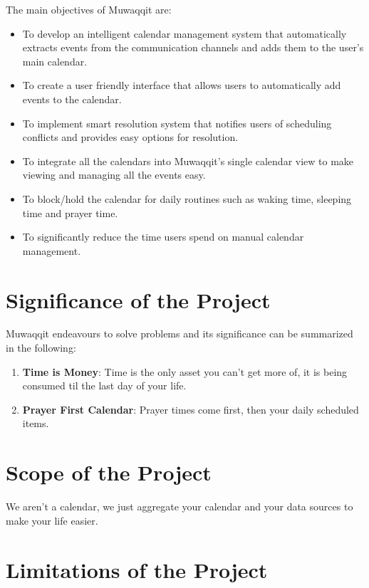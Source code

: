 \documentclass[12pt,a4paper]{article}
\begin{document}
The main objectives of Muwaqqit are:

\begin{itemize}
    \item To develop an intelligent calendar management system that automatically extracts events from the communication channels and adds them to the user's main calendar.
    \item To create a user friendly interface that allows users to automatically add events to the calendar.
    \item To implement smart resolution system that notifies users of scheduling conflicts and provides easy options for resolution.
    \item To integrate all the calendars into Muwaqqit's single calendar view to make viewing and managing all the events easy.
    \item To block/hold the calendar for daily routines such as waking time, sleeping time and prayer time.
    \item To significantly reduce the time users spend on manual calendar management.
\end{itemize}

\section{Significance of the Project}

Muwaqqit endeavours to solve problems and its significance can be summarized in the following:

\begin{enumerate}
    \item \textbf{Time is Money}: Time is the only asset you can't get more of, it is being consumed til the last day of your life.
    \item \textbf{Prayer First Calendar}: Prayer times come first, then your daily scheduled items.
\end{enumerate}

\section{Scope of the Project}

We aren't a calendar, we just aggregate your calendar and your data sources to make your life easier.

\section{Limitations of the Project}
\end{document}
